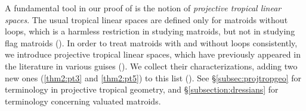 \documentclass[11pt]{amsart}
\newcommand{\RR}{\mathbb R}
\newcommand{\PP}{\mathbb P}
\newcommand{\TT}{\mathbb T}
\newcommand{\MM}{{\boldsymbol M}}
\newcommand{\bv}{{\mathbf v}}
\theoremstyle{definition}
\begin{document}

A fundamental tool in our proof of  is the notion of \emph{projective tropical linear spaces}.  The usual tropical linear spaces are defined only for matroids without loops, which is a harmless restriction in studying matroids, but not in studying flag matroids ().
In order to treat matroids with and without loops consistently, we introduce projective tropical linear spaces, which have previously appeared in the literature in various guises ().
We collect their characterizations, adding two new ones  (\ref{thm2:pt3} and \ref{thm2:pt5}) to this list ().  See \S \ref{subsec:projtropgeo} for terminology in projective tropical geometry, and \S \ref{subsection:dressians} for terminology concerning valuated matroids.

\end{document}
